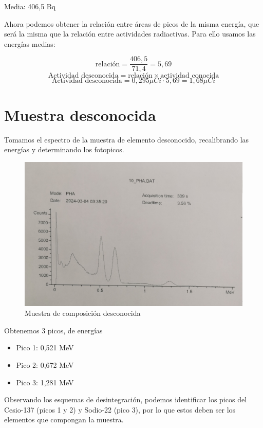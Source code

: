 \documentclass[a4paper,12pt,spanish]{article}
\begin{document}
	Media: 406,5 Bq
	
	\vspace{\baselineskip}
	
	Ahora podemos obtener la relación entre áreas de picos de la misma energía, que será la misma que la relación entre actividades radiactivas. Para ello usamos las energías medias:
	
	\[ \text{relación} = \frac{406,5}{71,4} = 5,69
	\]
	\[ \text{Actividad desconocida} = \text{relación} \times \text{actividad conocida}
	\]
	\[ \text{Actividad desconocida} = 0,295\si{\mu Ci} \cdot 5,69 = 1,68\si{\mu Ci}
	\]
	
	
	\section{Muestra desconocida}
	
	Tomamos el espectro de la muestra de elemento desconocido, recalibrando las energías y determinando los fotopicos.
	
	\begin{figure}[H]
		\centering
		\includegraphics[width=0.7\linewidth]{../graficas_procesadas/PHA_10}
		\caption{Muestra de composición desconocida}
		\label{fig:pha10}
	\end{figure}
	
	
	Obtenemos 3 picos, de energías 
	\begin{itemize}
		\item Pico 1: 0,521 MeV
		\item Pico 2: 0,672 MeV
		\item Pico 3: 1,281 MeV
	\end{itemize}
	
	Observando los esquemas de desintegración, podemos identificar los picos del Cesio-137 (picos 1 y 2) y Sodio-22 (pico 3), por lo que estos deben ser los elementos que compongan la muestra.
	
	
	
\end{document}
